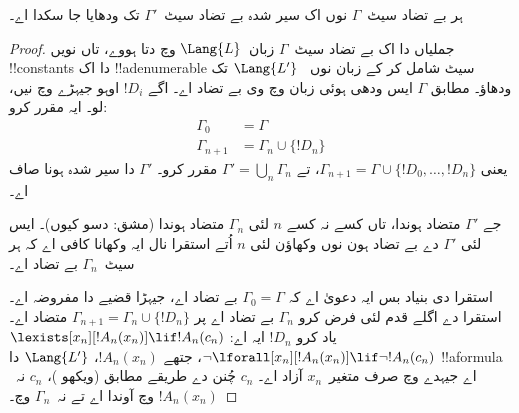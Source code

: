 \documentclass[../../../include/open-logic-section]{subfiles}
\begin{document}
\begin{lem}
ہر بے تضاد سیٹ~$\Gamma$ نوں اک سیر شدہ بے تضاد
سیٹ~$\Gamma'$ تک ودھایا جا سکدا اے۔
\end{lem}

\begin{proof}
جملیاں دا اک بے تضاد سیٹ~$\Gamma$ زبان~$\Lang{L}$
وچ دتا ہووے، تاں نویں !!{constant}s دا اک
!!a{denumerable} سیٹ شامل کر کے زبان نوں
~$\Lang{L'}$ تک ودھاؤ۔  مطابق
$\Gamma$ ایس ودھی ہوئی زبان وچ وی بے تضاد اے۔ اگے
$!D_i$ اوہو جیہڑے  وچ نیں، لو۔
ایہ مقرر کرو:
\begin{align*}
\Gamma_0 & = \Gamma \\
\Gamma_{n+1} & = \Gamma_n \cup \{!D_n \}
\end{align*}
یعنی $\Gamma_{n+1} = \Gamma \cup \{ !D_0, \dots, !D_n \}$،
تے $\Gamma' = \bigcup_{n} \Gamma_n$ مقرر کرو۔
$\Gamma'$ دا سیر شدہ ہونا صاف اے۔

جے $\Gamma'$ متضاد ہوندا، تاں کسے نہ کسے $n$ لئی
$\Gamma_n$ متضاد ہوندا (مشق: دسو کیوں)۔ ایس لئی
$\Gamma'$ دے بے تضاد ہون نوں وکھاؤن لئی $n$ اُتے
استقرا نال ایہ وکھانا کافی اے کہ ہر سیٹ~$\Gamma_n$
بے تضاد اے۔

استقرا دی بنیاد بس ایہ دعویٰ اے کہ $\Gamma_0 = \Gamma$
بے تضاد اے، جیہڑا قضیے دا مفروضہ اے۔ استقرا دے
اگلے قدم لئی فرض کرو $\Gamma_{n}$ بے تضاد اے پر
$\Gamma_{n+1} =
\Gamma_n \cup \{!D_n\}$ متضاد اے۔ یاد کرو
$!D_n$ ایہ اے:
{$\lexists[x_{n}][!A_{n}(x_n)] \lif !A_{n}(c_{n})$}
{$\lnot\lforall[x_{n}][!A_{n}(x_n)] \lif \lnot !A_{n}(c_{n})$}،
جتھے $!A_n(x_n)$، $\Lang{L'}$ دا !!a{formula} اے
جیہدے وچ صرف متغیر~$x_n$ آزاد اے۔ $c_n$ چُنن دے
طریقے مطابق (ویکھو )، $c_n$
نہ~$!A_n(x_n)$ وچ آوندا اے تے نہ~$\Gamma_n$ وچ۔


\end{proof}
\end{document}

